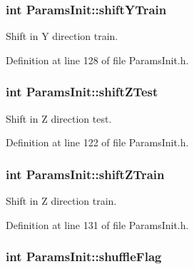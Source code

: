\subsubsection[{\texorpdfstring{shift\+Y\+Train}{shiftYTrain}}]{\setlength{\rightskip}{0pt plus 5cm}int Params\+Init\+::shift\+Y\+Train}\hypertarget{classParamsInit_a189f3eeefe98e0f42003ead7775cd415}{}\label{classParamsInit_a189f3eeefe98e0f42003ead7775cd415}


Shift in Y direction train. 



Definition at line 128 of file Params\+Init.\+h.

\subsubsection[{\texorpdfstring{shift\+Z\+Test}{shiftZTest}}]{\setlength{\rightskip}{0pt plus 5cm}int Params\+Init\+::shift\+Z\+Test}\hypertarget{classParamsInit_af40abf536ea366152b0832bb915f4a9c}{}\label{classParamsInit_af40abf536ea366152b0832bb915f4a9c}


Shift in Z direction test. 



Definition at line 122 of file Params\+Init.\+h.

\subsubsection[{\texorpdfstring{shift\+Z\+Train}{shiftZTrain}}]{\setlength{\rightskip}{0pt plus 5cm}int Params\+Init\+::shift\+Z\+Train}\hypertarget{classParamsInit_a97c904605860c9b8d9f2c6a7cc037f0d}{}\label{classParamsInit_a97c904605860c9b8d9f2c6a7cc037f0d}


Shift in Z direction train. 



Definition at line 131 of file Params\+Init.\+h.

\subsubsection[{\texorpdfstring{shuffle\+Flag}{shuffleFlag}}]{\setlength{\rightskip}{0pt plus 5cm}int Params\+Init\+::shuffle\+Flag}\hypertarget{classParamsInit_af816db821e4c8e19d599806617f11176}{}\label{classParamsInit_af816db821e4c8e19d599806617f11176}


